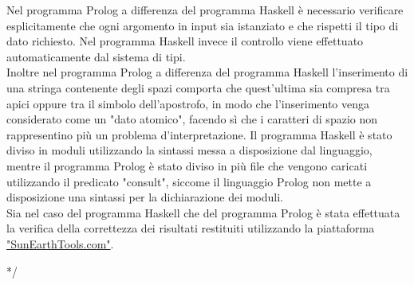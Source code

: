 \documentclass{article}
\begin{document}
Nel programma Prolog a differenza del programma Haskell è necessario verificare esplicitamente che ogni argomento in input sia istanziato e che rispetti il tipo di dato richiesto. Nel programma Haskell invece il controllo viene effettuato automaticamente dal sistema di tipi.\\
Inoltre nel programma Prolog a differenza del programma Haskell l'inserimento di una stringa contenente degli spazi comporta che quest'ultima sia compresa tra apici oppure tra il simbolo dell'apostrofo, in modo che l'inserimento venga considerato come un "dato atomico",  facendo sì che i caratteri di spazio non rappresentino più un problema d'interpretazione.
Il programma Haskell è stato diviso in moduli utilizzando la sintassi messa a disposizione dal linguaggio, mentre il programma Prolog è stato diviso in più file che vengono caricati utilizzando il predicato "consult", siccome il linguaggio Prolog non mette a disposizione una sintassi per la dichiarazione dei moduli.\\
Sia nel caso del programma Haskell che del programma Prolog è stata effettuata la verifica della correttezza dei risultati restituiti utilizzando la piattaforma \href{https://www.sunearthtools.com/it/tools/distance.php}{"SunEarthTools.com"}.

*/
\end{document}
